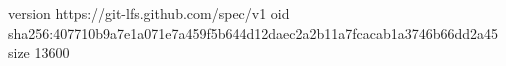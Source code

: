 version https://git-lfs.github.com/spec/v1
oid sha256:407710b9a7e1a071e7a459f5b644d12daec2a2b11a7fcacab1a3746b66dd2a45
size 13600
